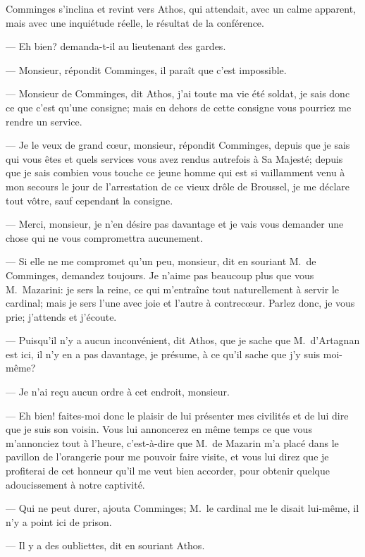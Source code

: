 Comminges s'inclina et revint vers Athos, qui attendait, avec un calme apparent, mais avec une inquiétude réelle, le résultat de la conférence.

— Eh bien? demanda-t-il au lieutenant des gardes.

— Monsieur, répondit Comminges, il paraît que c'est impossible.

— Monsieur de Comminges, dit Athos, j'ai toute ma vie été soldat, je sais donc ce que c'est qu'une consigne; mais en dehors de cette consigne vous pourriez me rendre un service.

— Je le veux de grand cœur, monsieur, répondit Comminges, depuis que je sais qui vous êtes et quels services vous avez rendus autrefois à Sa Majesté; depuis que je sais combien vous touche ce jeune homme qui est si vaillamment venu à mon secours le jour de l'arrestation de ce vieux drôle de Broussel, je me déclare tout vôtre, sauf cependant la consigne.

— Merci, monsieur, je n'en désire pas davantage et je vais vous demander une chose qui ne vous compromettra aucunement.

— Si elle ne me compromet qu'un peu, monsieur, dit en souriant M.~de Comminges, demandez toujours. Je n'aime pas beaucoup plus que vous M.~Mazarini: je sers la reine, ce qui m'entraîne tout naturellement à servir le cardinal; mais je sers l'une avec joie et l'autre à contrecœur. Parlez donc, je vous prie; j'attends et j'écoute.

— Puisqu'il n'y a aucun inconvénient, dit Athos, que je sache que M.~d'Artagnan est ici, il n'y en a pas davantage, je présume, à ce qu'il sache que j'y suis moi-même?

— Je n'ai reçu aucun ordre à cet endroit, monsieur.

— Eh bien! faites-moi donc le plaisir de lui présenter mes civilités et de lui dire que je suis son voisin. Vous lui annoncerez en même temps ce que vous m'annonciez tout à l'heure, c'est-à-dire que M.~de Mazarin m'a placé dans le pavillon de l'orangerie pour me pouvoir faire visite, et vous lui direz que je profiterai de cet honneur qu'il me veut bien accorder, pour obtenir quelque adoucissement à notre captivité.

— Qui ne peut durer, ajouta Comminges; M.~le cardinal me le disait lui-même, il n'y a point ici de prison.

— Il y a des oubliettes, dit en souriant Athos.

